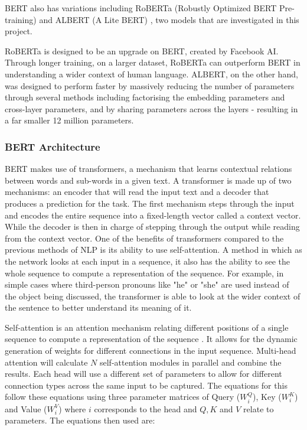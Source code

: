 BERT also has variations including RoBERTa (Robustly Optimized BERT Pre-training) \cite{RoBERTa} and ALBERT (A Lite BERT) \cite{ALBERT}, two models that are investigated in this project. 

RoBERTa is designed to be an upgrade on BERT, created by Facebook AI. Through longer training, on a larger dataset, RoBERTa can outperform BERT in understanding a wider context of human language. ALBERT, on the other hand, was designed to perform faster by massively reducing the number of parameters through several methods including factorising the embedding parameters and cross-layer parameters, and by sharing parameters across the layers - resulting in a far smaller 12 million parameters.

\subsubsection{BERT Architecture}

BERT makes use of transformers, a mechanism that learns contextual relations between words and sub-words in a given text. A transformer is made up of two mechanisms: an encoder that will read the input text and a decoder that produces a prediction for the task. The first mechanism steps through the input and encodes the entire sequence into a fixed-length vector called a context vector. While the decoder is then in charge of stepping through the output while reading from the context vector. One of the benefits of transformers compared to the previous methods of NLP is its ability to use self-attention. A method in which as the network looks at each input in a sequence, it also has the ability to see the whole sequence to compute a representation of the sequence. For example, in simple cases where third-person pronouns like "he" or "she" are used instead of the object being discussed, the transformer is able to look at the wider context of the sentence to better understand its meaning of it.

Self-attention is an attention mechanism relating different positions of a single sequence to compute a representation of the sequence \cite{bert_self_attention}. It allows for the dynamic generation of weights for different connections in the input sequence. Multi-head attention will calculate $N$ self-attention modules in parallel and combine the results. Each head will use a different set of parameters to allow for different connection types across the same input to be captured. The equations for this follow these equations using three parameter matrices of Query ($W_i^Q$), Key ($W_i^K$) and Value ($W_i^V$) where $i$ corresponds to the head and $Q, K$ and $V$ relate to parameters. The equations then used are:

